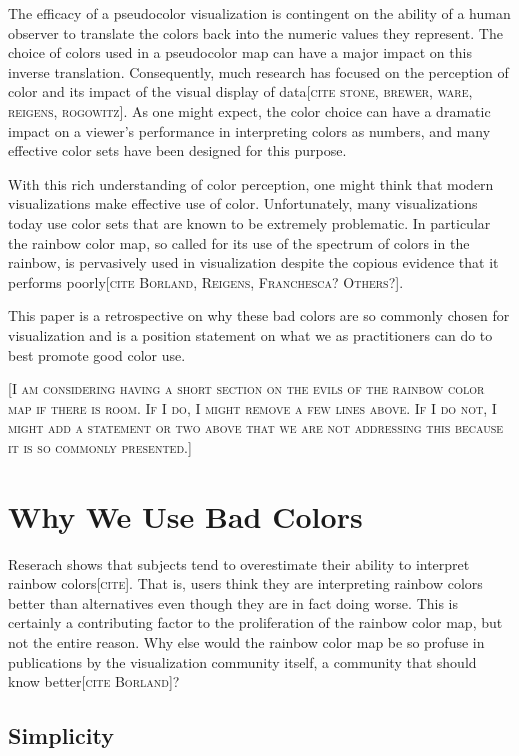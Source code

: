 \documentclass[letterpaper,twocolumn,fleqn]{article}
\newcommand{\fix}[1]{{\color{red}\textsc{[#1]}}}
\begin{document}
The efficacy of a pseudocolor visualization is contingent on the ability of
a human observer to translate the colors back into the numeric values they
represent. The choice of colors used in a pseudocolor map can have a major
impact on this inverse translation. Consequently, much research has focused
on the perception of color and its impact of the visual display of
data\fix{cite stone, brewer, ware, reigens, rogowitz}. As one might expect,
the color choice can have a dramatic impact on a viewer's performance in
interpreting colors as numbers, and many effective color sets have been
designed for this purpose.

With this rich understanding of color perception, one might think that
modern visualizations make effective use of color. Unfortunately, many
visualizations today use color sets that are known to be extremely
problematic. In particular the rainbow color map, so called for its use of
the spectrum of colors in the rainbow, is pervasively used in visualization
despite the copious evidence that it performs poorly\fix{cite Borland,
  Reigens, Franchesca? Others?}.

This paper is a retrospective on why these bad colors are so commonly
chosen for visualization and is a position statement on what we as
practitioners can do to best promote good color use.

\fix{I am considering having a short section on the evils of the rainbow
  color map if there is room. If I do, I might remove a few lines above. If
  I do not, I might add a statement or two above that we are not addressing
  this because it is so commonly presented.}


\section{Why We Use Bad Colors}

\noindent
Reserach shows that subjects tend to overestimate their ability to
interpret rainbow colors\fix{cite}. That is, users think they are
interpreting rainbow colors better than alternatives even though they are
in fact doing worse. This is certainly a contributing factor to the
proliferation of the rainbow color map, but not the entire reason. Why else
would the rainbow color map be so profuse in publications by the
visualization community itself, a community that should know
better\fix{cite Borland}?

\subsection{Simplicity}
\end{document}
